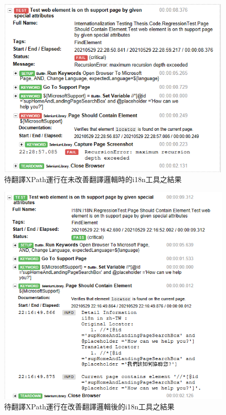 \begin{figure}[H]
\includegraphics[width= \textwidth]{../論文截圖/4-2-3 @placeholder運行在第一版i18n.png}
\caption{待翻譯XPath運行在未改善翻譯邏輯時的i18n工具之結果}
\end{figure}

\begin{figure}[H]
\includegraphics[width= \textwidth]{../論文截圖/4-2-4 @placeholder運行在當前i18n版本.png}
\caption{待翻譯XPath運行在改善翻譯邏輯後的i18n工具之結果}
\end{figure}

